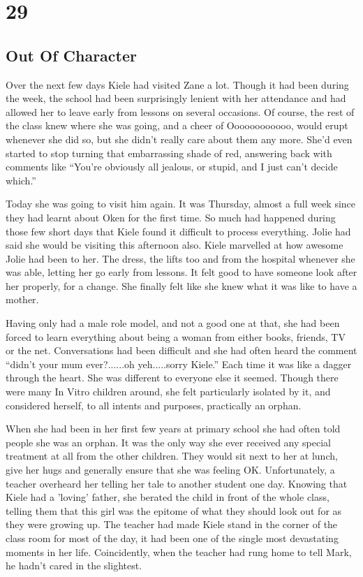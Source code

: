 \chapter{29}
\section{Out Of Character}


Over the next few days Kiele had visited Zane a lot.  Though it had been during the week, the school had been surprisingly lenient with her attendance and had allowed her to leave early from lessons on several occasions.  Of course, the rest of the class knew where she was going, and a cheer of Oooooooooooo, would erupt whenever she did so, but she didn't really care about them any more.  She'd even started to stop turning that embarrassing shade of red, answering back with comments like ``You're obviously all jealous, or stupid, and I just can't decide which.''

Today she was going to visit him again.  It was Thursday, almost a full week since they had learnt about Oken for the first time.  So much had happened during those few short days that Kiele found it difficult to process everything.  Jolie had said she would be visiting this afternoon also.  Kiele marvelled at how awesome Jolie had been to her.  The dress, the lifts too and from the hospital whenever she was able, letting her go early from lessons.  It felt good to have someone look after her properly, for a change.  She finally felt like she knew what it was like to have a mother.

Having only had a male role model, and not a good one at that, she had been forced to learn everything about being a woman from either books, friends, TV or the net.  Conversations had been difficult and she had often heard the comment ``didn't your mum ever?......oh yeh.....sorry Kiele.''  Each time it was like a dagger through the heart.  She was different to everyone else it seemed.  Though there were many In Vitro children around, she felt particularly isolated by it, and considered herself, to all intents and purposes,  practically an orphan.

When she had been in her first few years at primary school she had often told people she was an orphan.  It was the only way she ever received any special treatment at all from the other children.  They would sit next to her at lunch, give her hugs and generally ensure that she was feeling OK.  Unfortunately, a teacher overheard her telling her tale to another student one day.  Knowing that Kiele had a 'loving' father, she berated the child in front of the whole class, telling them that this girl was the epitome of what they should look out for as they were growing up.  The teacher had made Kiele stand in the corner of the class room for most of the day, it had been one of the single most devastating moments in her life.  Coincidently, when the teacher had rung home to tell Mark, he hadn't cared in the slightest.

